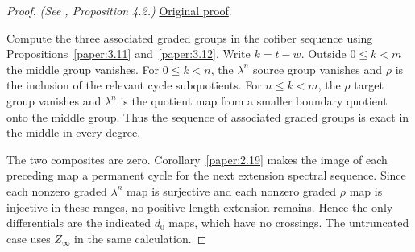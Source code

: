 \begin{proof}
\textit{(See \cite{LWX126}, Proposition 4.2.)} \href{paper/main.tex.html#L1030}{Original proof}.

Compute the three associated graded groups in the cofiber sequence using Propositions~\ref{paper:3.11} and~\ref{paper:3.12}. Write $k=t-w$. Outside $0\le k<m$ the middle group vanishes. For $0\le k<n$, the $\lambda^n$ source group vanishes and $\rho$ is the inclusion of the relevant cycle subquotients. For $n\le k<m$, the $\rho$ target group vanishes and $\lambda^n$ is the quotient map from a smaller boundary quotient onto the middle group. Thus the sequence of associated graded groups is exact in the middle in every degree.

The two composites are zero. Corollary~\ref{paper:2.19} makes the image of each preceding map a permanent cycle for the next extension spectral sequence. Since each nonzero graded $\lambda^n$ map is surjective and each nonzero graded $\rho$ map is injective in these ranges, no positive-length extension remains. Hence the only differentials are the indicated $d_0$ maps, which have no crossings. The untruncated case uses $Z_\infty$ in the same calculation.
\end{proof}

